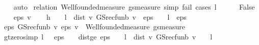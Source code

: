 \begin{isabellebody}
\ \ %
\endisadelimproof
%
\isatagproof
{}\isamarkupfalse%
\ auto%
\endisatagproof
{\isafoldproof}%
%
\isadelimproof
\isanewline
%
\endisadelimproof
{}\isamarkupfalse%
\isanewline
%
\isadelimproof
%
\endisadelimproof
%
\isatagproof
{}\isamarkupfalse%
\ {\isacharparenleft}{\kern0pt}relation\ {\isachardoublequoteopen}Wellfounded{\isachardot}{\kern0pt}measure\ gs{\isacharunderscore}{\kern0pt}measure{\isachardoublequoteclose}{\isacharcomma}{\kern0pt}\ {\isacharparenleft}{\kern0pt}simp{\isacharsemicolon}{\kern0pt}\ fail{\isacharparenright}{\kern0pt}{\isacharcomma}{\kern0pt}\ cases\ {\isachardoublequoteopen}l\ {\isacharequal}{\kern0pt}\ {}{\isachardoublequoteclose}{\isacharparenright}{\kern0pt}\isanewline
\ \ \isamarkupfalse%
\ False\isanewline
\ \ \isamarkupfalse%
\ eps\ v\isanewline
\ \ \isamarkupfalse%
\ h{\isacharcolon}{\kern0pt}\ {\isachardoublequoteopen}{\isasymnot}\ {\isacharparenleft}{\kern0pt}{}\ {\isacharasterisk}{\kern0pt}\ l\ {\isacharasterisk}{\kern0pt}\ dist\ v\ {\isacharparenleft}{\kern0pt}GS{\isacharunderscore}{\kern0pt}rec{\isacharunderscore}{\kern0pt}fun\isactrlsub b\ v{\isacharparenright}{\kern0pt}\ {\isacharless}{\kern0pt}\ eps\ {\isacharasterisk}{\kern0pt}\ {\isacharparenleft}{\kern0pt}{}\ {\isacharminus}{\kern0pt}\ l{\isacharparenright}{\kern0pt}\ {\isasymor}\ eps\ {\isasymle}\ {}{\isacharparenright}{\kern0pt}{\isachardoublequoteclose}\isanewline
\ \ \isamarkupfalse%
\ {\isachardoublequoteopen}{\isacharparenleft}{\kern0pt}{\isacharparenleft}{\kern0pt}eps{\isacharcomma}{\kern0pt}\ GS{\isacharunderscore}{\kern0pt}rec{\isacharunderscore}{\kern0pt}fun\isactrlsub b\ v{\isacharparenright}{\kern0pt}{\isacharcomma}{\kern0pt}\ eps{\isacharcomma}{\kern0pt}\ v{\isacharparenright}{\kern0pt}\ {\isasymin}\ Wellfounded{\isachardot}{\kern0pt}measure\ gs{\isacharunderscore}{\kern0pt}measure{\isachardoublequoteclose}\isanewline
\ \ \isamarkupfalse%
\ {\isacharminus}{\kern0pt}\isanewline
\ \ \ \ \isamarkupfalse%
\ gt{\isacharunderscore}{\kern0pt}zero{\isacharbrackleft}{\kern0pt}simp{\isacharbrackright}{\kern0pt}{\isacharcolon}{\kern0pt}\ {\isachardoublequoteopen}l\ {\isasymnoteq}\ {}{\isachardoublequoteclose}\ {\isachardoublequoteopen}eps\ {\isachargreater}{\kern0pt}\ {}{\isachardoublequoteclose}\ \ dist{\isacharunderscore}{\kern0pt}ge{\isacharcolon}{\kern0pt}\ {\isachardoublequoteopen}eps\ {\isacharasterisk}{\kern0pt}\ {\isacharparenleft}{\kern0pt}{}\ {\isacharminus}{\kern0pt}\ l{\isacharparenright}{\kern0pt}\ {\isasymle}\ dist\ v\ {\isacharparenleft}{\kern0pt}GS{\isacharunderscore}{\kern0pt}rec{\isacharunderscore}{\kern0pt}fun\isactrlsub b\ v{\isacharparenright}{\kern0pt}\ {\isacharasterisk}{\kern0pt}\ {\isacharparenleft}{\kern0pt}{}\ {\isacharasterisk}{\kern0pt}\ l{\isacharparenright}{\kern0pt}{\isachardoublequoteclose}\isanewline

\end{isabellebody}
